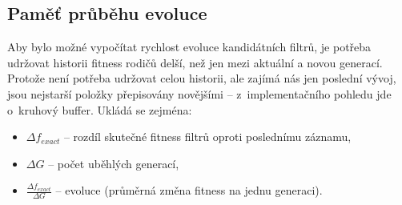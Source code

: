 




\subsection{Paměť průběhu evoluce}
\label{secDesignHistory}

Aby bylo možné vypočítat rychlost evoluce kandidátních filtrů, je potřeba udržovat historii fitness rodičů delší, než jen mezi aktuální a novou generací. Protože není potřeba udržovat celou historii, ale zajímá nás jen poslední vývoj, jsou nejstarší položky přepisovány novějšími -- z~implementačního pohledu jde o~kruhový buffer. Ukládá se zejména:

\begin{itemize}
    \item $\Delta{}f_{\mathit{exact}}$ -- rozdíl skutečné fitness filtrů oproti poslednímu záznamu,
    \item $\Delta{}G$ -- počet uběhlých generací,
    \item $\frac{\Delta{}f_{\mathit{exact}}}{\Delta{}G}$ --  evoluce (průměrná změna fitness na jednu generaci).
\end{itemize}

